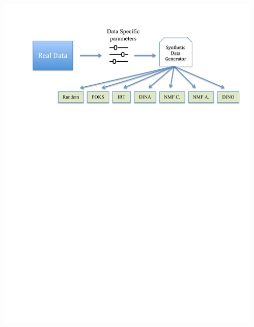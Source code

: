 \documentclass{beamer}
\begin{document}
\begin{frame}
\begin{overprint}
\begin{columns}
\begin{column}{0.7\textwidth}
			\includegraphics[trim=1cm 10cm 1cm 1cm,scale=0.43]{images/Approach2.pdf}
		\end{column}
		\begin{column}{0.3\textwidth}
		\end{column}
		\end{columns}
		 		\begin{columns}
		\begin{column}{0.7\textwidth}
			\vspace{-0.8cm}

\end{column}
\end{columns}
\end{overprint}
\end{frame}
\end{document}
